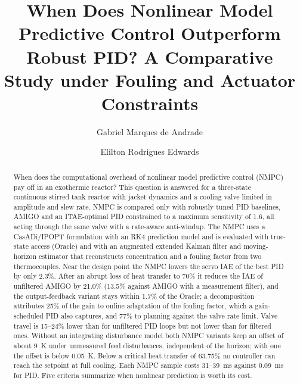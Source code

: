 \documentclass[a4paper,fleqn]{cas-dc}
\begin{document}
\let\WriteBookmarks\relax
\def\floatpagepagefraction{1}
\def\textpagefraction{.001}

\title [mode = title]{When Does Nonlinear Model Predictive Control Outperform Robust PID? A Comparative Study under Fouling and Actuator Constraints}

\author[1]{Gabriel Marques de Andrade}
\cormark[1]

\author[1]{Elilton Rodrigues Edwards}



\begin{abstract}
When does the computational overhead of nonlinear model predictive control (NMPC) pay off in an exothermic reactor? This question is answered for a three-state continuous stirred tank reactor with jacket dynamics and a cooling valve limited in amplitude and slew rate. NMPC is compared only with robustly tuned PID baselines, AMIGO and an ITAE-optimal PID constrained to a maximum sensitivity of 1.6, all acting through the same valve with a rate-aware anti-windup. The NMPC uses a CasADi/IPOPT formulation with an RK4 prediction model and is evaluated with true-state access (Oracle) and with an augmented extended Kalman filter and moving-horizon estimator that reconstructs concentration and a fouling factor from two thermocouples. Near the design point the NMPC lowers the servo IAE of the best PID by only 2.3\%. After an abrupt loss of heat transfer to 70\% it reduces the IAE of unfiltered AMIGO by 21.0\% (13.5\% against AMIGO with a measurement filter), and the output-feedback variant stays within 1.7\% of the Oracle; a decomposition attributes 25\% of the gain to online adaptation of the fouling factor, which a gain-scheduled PID also captures, and 77\% to planning against the valve rate limit. Valve travel is 15--24\% lower than for unfiltered PID loops but not lower than for filtered ones. Without an integrating disturbance model both NMPC variants keep an offset of about 9~K under unmeasured feed disturbances, independent of the horizon; with one the offset is below 0.05~K. Below a critical heat transfer of 63.75\% no controller can reach the setpoint at full cooling. Each NMPC sample costs 31--39~ms against 0.09~ms for PID. Five criteria summarize when nonlinear prediction is worth its cost.
\end{abstract}
\end{document}
